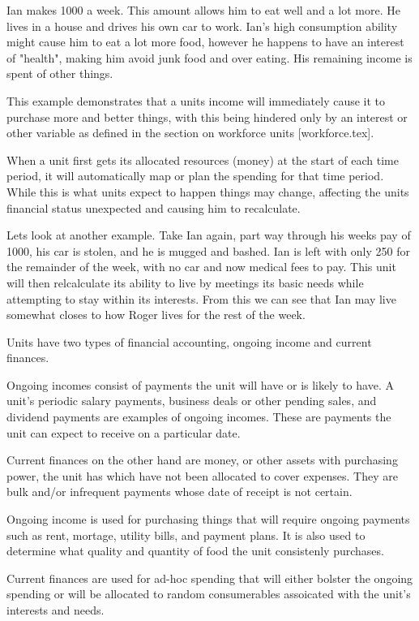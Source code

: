 Ian makes  1000 a week. This amount allows him to eat well and a lot more. He lives in a house and drives his own car to work. Ian's high consumption ability might cause him to eat a lot more food, however he happens to have an interest of "health", making him avoid junk food and over eating. His remaining income is spent of other things.

This example demonstrates that a units income will immediately cause it to purchase more and better things, with this being hindered only by an interest or other variable as defined in the section on workforce units [workforce.tex].


When a unit first gets its allocated resources (money) at the start of each time period, it will automatically map or plan the spending for that time period. While this is what units expect to happen things may change, affecting the units financial status unexpected and causing him to recalculate.

Lets look at another example. Take Ian again, part way through his weeks pay of 1000, his car is stolen, and he is mugged and bashed. Ian is left with only 250 for the remainder of the week, with no car and now medical fees to pay. This unit will then relcalculate its ability to live by meetings its basic needs while attempting to stay within its interests. From this we can see that Ian may live somewhat closes to how Roger lives for the rest of the week.


Units have two types of financial accounting, ongoing income and current finances.

Ongoing incomes consist of payments the unit will have or is likely to have. A unit's periodic salary payments, business deals or other pending sales, and dividend payments are examples of ongoing incomes. These are payments the unit can expect to receive on a particular date.

Current finances on the other hand are money, or other assets with purchasing power, the unit has which have not been allocated to cover expenses. They are bulk and/or infrequent payments whose date of receipt is not certain.

Ongoing income is used for purchasing things that will require ongoing payments such as rent, mortage, utility bills, and payment plans. It is also used to determine what quality and quantity of food the unit consistenly purchases.

Current finances are used for ad-hoc spending that will either bolster the ongoing spending or will be allocated to random consumerables assoicated with the unit's interests and needs.


